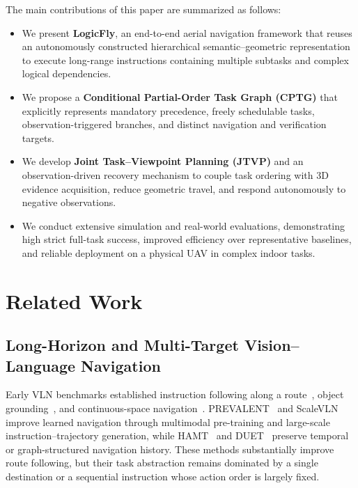 \documentclass[letterpaper,10pt,journal]{IEEEtran}
\begin{document}
The main contributions of this paper are summarized as follows:
\begin{itemize}
\setlength{\itemsep}{0pt}
\setlength{\parsep}{0pt}
\item We present \textbf{LogicFly}, an end-to-end aerial navigation framework that reuses an autonomously constructed hierarchical semantic--geometric representation to execute long-range instructions containing multiple subtasks and complex logical dependencies.
\item We propose a \textbf{Conditional Partial-Order Task Graph (CPTG)} that explicitly represents mandatory precedence, freely schedulable tasks, observation-triggered branches, and distinct navigation and verification targets.
\item We develop \textbf{Joint Task--Viewpoint Planning (JTVP)} and an observation-driven recovery mechanism to couple task ordering with 3D evidence acquisition, reduce geometric travel, and respond autonomously to negative observations.
\item We conduct extensive simulation and real-world evaluations, demonstrating high strict full-task success, improved efficiency over representative baselines, and reliable deployment on a physical UAV in complex indoor tasks.
\end{itemize}



\section{Related Work}
\subsection{Long-Horizon and Multi-Target Vision--Language Navigation}

Early VLN benchmarks established instruction following along a route~\cite{anderson2018r2r,ku2020rxr}, object grounding~\cite{qi2020reverie,zhu2021soon}, and continuous-space navigation~\cite{krantz2020vlnce}. PREVALENT~\cite{hao2020prevalent} and ScaleVLN~\cite{wang2023scalevln} improve learned navigation through multimodal pre-training and large-scale instruction--trajectory generation, while HAMT~\cite{chen2021hamt} and DUET~\cite{chen2022duet} preserve temporal or graph-structured navigation history. These methods substantially improve route following, but their task abstraction remains dominated by a single destination or a sequential instruction whose action order is largely fixed.
\end{document}
